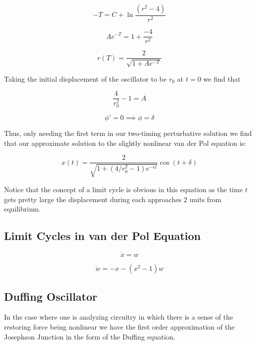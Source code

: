\documentclass[12pt]{article}
\begin{document}
\begin{equation}
-T = C + \ln \dfrac{(r^2-4)}{r^2} 
\end{equation}

\begin{equation}
Ae^{-T} = 1 + \dfrac{-4}{r^2}
\end{equation}

\begin{equation}
r(T)=\dfrac{2}{\sqrt{1 + Ae^{-T}}}
\end{equation}

Taking the initial displacement of the oscillator to be $r_0$ at $t = 0$ we find that

\begin{equation}
\dfrac{4}{r_0^2} - 1 = A
\end{equation}

\begin{equation}
\phi' = 0 \implies \phi = \delta
\end{equation}

Thus, only needing the first term in our two-timing perturbative solution we find that our approximate solution to the slightly nonlinear van der Pol equation is:

\begin{equation}
x(t) = \dfrac{2}{\sqrt{1 + (4/r_0^2 - 1)e^{-\epsilon t}}} \cos(t + \delta)
\end{equation}

Notice that the concept of a limit cycle is obvious in this equation as the time $t$ gets pretty large the displacement during each approaches 2 units from equilibrium.

\subsection{Limit Cycles in van der Pol Equation}

\begin{equation}
\dot{x} = w
\end{equation}

\begin{equation}
\dot{w} = -x -(x^2 - 1)w
\end{equation}


\subsection{Duffing Oscillator}

In the case where one is analyzing circuitry in which there is a sense of the restoring force being nonlinear we have the first order approximation of the Josephson Junction in the form of the Duffing equation.
\end{document}
